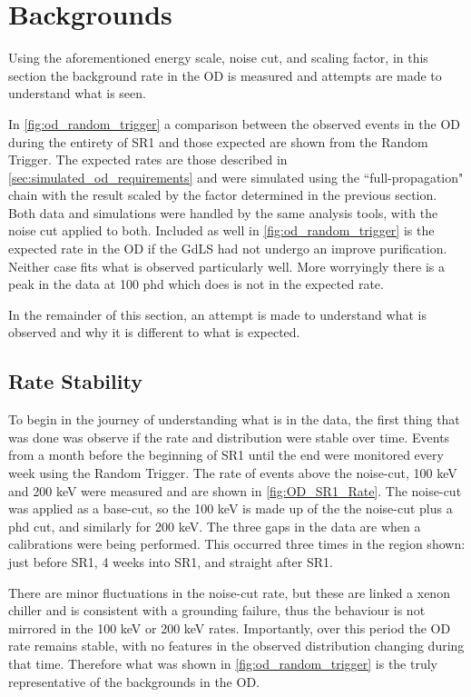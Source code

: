 \section{Backgrounds}
\label{sec:od_analysis_backgrounds}
\par
Using the aforementioned energy scale, noise cut, and scaling factor, in this section the background rate in the OD is measured and attempts are made to understand what is seen.
\par
In \autoref{fig:od_random_trigger} a comparison between the observed events in the OD during the entirety of SR1 and those expected are shown from the Random Trigger.
The expected rates are those described in \autoref{sec:simulated_od_requirements} and were simulated using the ``full-propagation" chain with the result scaled by the factor determined in the previous section.
Both data and simulations were handled by the same analysis tools, with the noise cut applied to both.
Included as well in \autoref{fig:od_random_trigger} is the expected rate in the OD if the GdLS had not undergo an improve purification.
Neither case fits what is observed particularly well.
More worryingly there is a peak in the data at 100 phd which does is not in the expected rate.




\par
In the remainder of this section, an attempt is made to understand what is observed and why it is different to what is expected.

\subsection{Rate Stability}

\par
To begin in the journey of understanding what is in the data, the first thing that was done was observe if the rate and distribution were stable over time.
Events from a month before the beginning of SR1 until the end were monitored every week using the Random Trigger.
The rate of events above the noise-cut, 100 keV and 200 keV were measured and are shown in \autoref{fig:OD_SR1_Rate}.
The noise-cut was applied as a base-cut, so the 100 keV is made up of the the noise-cut plus a phd cut, and similarly for 200 keV.
The three gaps in the data are when a calibrations were being performed.
This occurred three times in the region shown: just before SR1, 4 weeks into SR1, and straight after SR1.
\par
There are minor fluctuations in the noise-cut rate, but these are linked a xenon chiller and is consistent with a grounding failure, thus the behaviour is not mirrored in the 100 keV or 200 keV rates.
Importantly, over this period the OD rate remains stable, with no features in the observed distribution changing during that time.
Therefore what was shown in \autoref{fig:od_random_trigger} is the truly representative of the backgrounds in the OD.

